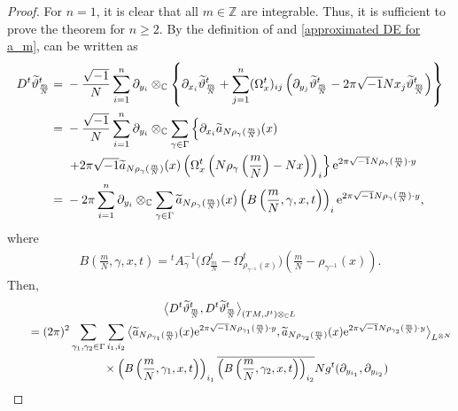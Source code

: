 \documentclass[pdftex]{sigma}
\numberwithin{equation}{section}
\newcommand{\C}{\mathbb{C}}
\newcommand{\Z}{\mathbb{Z}}
\renewcommand{\tilde}{\widetilde}
\begin{document}
\begin{proof}%
For $n=1$, it is clear that all $m\in \Z$ are integrable. Thus, it is sufficient to prove the theorem for $n\ge 2$. By the definition of \smash{${\tilde \vartheta}^t_{\frac{m}{N}}$} and \eqref{approximated DE for a_m}, \smash{$D^t {\tilde \vartheta}^t_{\frac{m}{N}}$} can be written as
\begin{align*}
D^t {\tilde \vartheta}^t_{\frac{m}{N}}
={}&-\frac{\sqrt{-1}}{N}\sum_{i=1}^n\partial_{y_i}\otimes_{\C}\left\{\partial_{x_i}{\tilde \vartheta}^t_{\frac{m}{N}}+\sum_{j=1}^n(\Omega^t_x)_{ij}\left(\partial_{y_j}{\tilde \vartheta}^t_{\frac{m}{N}}-2\pi\sqrt{-1}Nx_j {\tilde \vartheta}^t_{\frac{m}{N}}\right)\right\} \\
={}&-\frac{\sqrt{-1}}{N}\sum_{i=1}^n\partial_{y_i}\otimes_{\C}\sum_{\gamma \in \Gamma}\left\{\partial_{x_i}{\tilde a}_{N\rho_\gamma (\frac{m}{N})}(x)\right.\\
&\left. +2\pi\sqrt{-1}{\tilde a}_{N\rho_\gamma (\frac{m}{N})}(x) \left(\Omega^t_x \left( N\rho_{\gamma}\left(\frac{m}{N}\right)-Nx\right)\right)_i \right\} {\rm e}^{2\pi\sqrt{-1}N\rho_\gamma (\frac{m}{N})\cdot y} \\
={}&-2\pi \sum_{i=1}^n\partial_{y_i}\otimes_{\C}\sum_{\gamma \in \Gamma}{\tilde a}_{N\rho_\gamma (\frac{m}{N})}(x)\left( B\left(\frac{m}{N},\gamma, x,t\right)\right)_i {\rm e}^{2\pi\sqrt{-1}N\rho_\gamma (\frac{m}{N})\cdot y},
\end{align*}
where
\begin{align*}
B\left(\frac{m}{N}, \gamma ,x,t\right)={}^tA_{\gamma}^{-1}\bigl( \Omega^t_{\frac{m}{N}}-\Omega^t_{\rho_{\gamma^{-1}}(x)}\bigr)\left(\frac{m}{N}-\rho_{\gamma^{-1}}(x)\right).
\end{align*}
Then,
\begin{gather*}
\big\langle D^t {\tilde \vartheta}^t_{\frac{m}{N}} ,D^t {\tilde \vartheta}^t_{\frac{m}{N}} \big\rangle_{(TM, J^t)\otimes_{\C}L}\\
\qquad=(2\pi)^2\sum_{\gamma_1, \gamma_2 \in \Gamma}\sum_{i_1, i_2}\big\langle {\tilde a}_{N\rho_{\gamma_1} (\frac{m}{N})}(x){\rm e}^{2\pi\sqrt{-1}N\rho_{\gamma_1} (\frac{m}{N})\cdot y}, {\tilde a}_{N\rho_{\gamma_2} (\frac{m}{N})}(x){\rm e}^{2\pi\sqrt{-1}N\rho_{\gamma_2} (\frac{m}{N})\cdot y}\big\rangle_{L^{\otimes N}}\\
\phantom{\qquad=}{}\times \left( B\left(\frac{m}{N}, \gamma_1 ,x,t\right)\right)_{i_1}\overline{ \left( B\left(\frac{m}{N}, \gamma_2 ,x,t\right)\right)_{i_2}}Ng^t(\partial_{y_{i_1}}, \partial_{y_{i_2}})\\

\end{gather*}
\end{proof}
\end{document}
